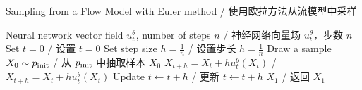 \begin{algorithm}[h]%
\caption{Sampling from a Flow Model with Euler method / 使用欧拉方法从流模型中采样}
\label{alg:sampling_flow_model}
\begin{algorithmic}[1]
\REQUIRE Neural network vector field $u_t^\theta$, number of steps $n$ / 神经网络向量场 $u_t^\theta$，步数 $n$
\STATE Set $t=0$ / 设置 $t=0$
\STATE Set step size $h=\frac{1}{n}$ / 设置步长 $h=\frac{1}{n}$
\STATE Draw a sample $X_0\sim p_{\rm{init}}$ / 从 $p_{\rm{init}}$ 中抽取样本 $X_0$
    \STATE $X_{t+h} = X_{t} + h u_t^\theta(X_t)$ / $X_{t+h} = X_{t} + h u_t^\theta(X_t)$
    \STATE Update $t\leftarrow t+h$ / 更新 $t\leftarrow t+h$
\ENDFOR
\RETURN $X_1$ / 返回 $X_1$
\end{algorithmic}
\end{algorithm}




